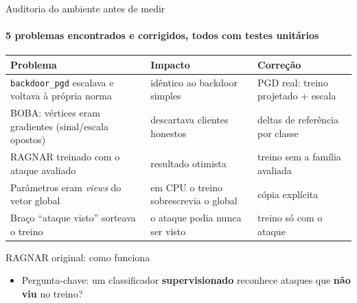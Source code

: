 \documentclass[aspectratio=169,11pt,xcolor=table]{beamer}
\begin{document}
\begin{frame}{Auditoria do ambiente antes de medir}
  \framesubtitle{5 problemas encontrados e corrigidos, todos com testes unitários}
  \footnotesize
  \begin{tabular}{p{4.6cm}p{4.2cm}p{4.2cm}}
    \toprule
    Problema & Impacto & Correção \\
    \midrule
    \texttt{backdoor\_pgd} escalava e voltava à própria norma & idêntico ao backdoor simples & PGD real: treino projetado + escala \\
    BOBA: vértices eram gradientes (sinal/escala opostos) & descartava clientes honestos & deltas de referência por classe \\
    RAGNAR treinado com o ataque avaliado & resultado otimista & treino sem a família avaliada \\
    Parâmetros eram \emph{views} do vetor global & em CPU o treino sobrescrevia o global & cópia explícita \\
    Braço ``ataque visto'' sorteava o treino & o ataque podia nunca ser visto & treino só com o ataque \\
    \bottomrule
  \end{tabular}
\end{frame}


\begin{frame}{RAGNAR original: como funciona}
  \centering
  \vspace{0.6em}
  \begin{itemize}
    \item Pergunta-chave: um classificador \textbf{supervisionado} reconhece ataques que \textbf{não viu} no treino?
  \end{itemize}
\end{frame}
\end{document}
